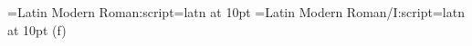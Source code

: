 
\font\testa={Latin Modern Roman:script=latn}   at 10pt
\font\testb={Latin Modern Roman/I:script=latn} at 10pt
\testa ({\testb f\/})
\bye
